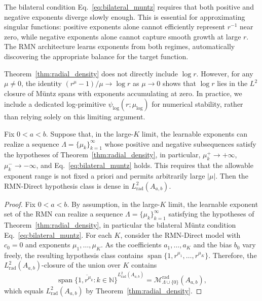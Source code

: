 \documentclass[twoside,11pt]{article}
\newcommand{\N}{\mathbb{N}}
\renewcommand{\eqref}[1]{Eq.~\ref{#1}}
\begin{document}
\begin{remark}
	\label{rem:negative_exponents}
	The bilateral condition \eqref{eq:bilateral_muntz} requires that both positive and negative exponents diverge slowly enough. This is essential for approximating singular functions: positive exponents alone cannot efficiently represent $r^{-1}$ near zero, while negative exponents alone cannot capture smooth growth at large $r$. The RMN architecture learns exponents from both regimes, automatically discovering the appropriate balance for the target function.
\end{remark}

\begin{remark}
	\label{rem:log_extension}
	Theorem~\ref{thm:radial_density} does not directly include $\log r$. However, for any $\mu \neq 0$, the identity $(r^\mu - 1)/\mu \to \log r$ as $\mu \to 0$ shows that $\log r$ lies in the $L^2$ closure of Müntz spans with exponents accumulating at zero. In practice, we include a dedicated log-primitive $\psi_{\log}(r;\mu_{\log})$ for numerical stability, rather than relying solely on this limiting argument.
\end{remark}

\begin{corollary}
	\label{cor:rmn_density}
	Fix $0<a<b$. Suppose that, in the large-$K$ limit, the learnable exponents can realize a sequence $\Lambda=\{\mu_k\}_{k=1}^\infty$ whose positive and negative subsequences satisfy the hypotheses of Theorem~\ref{thm:radial_density}, in particular, $\mu_k^+\to+\infty$, $\mu_k^-\to-\infty$, and \eqref{eq:bilateral_muntz} holds. This requires that the allowable exponent range is not fixed a priori and permits arbitrarily large $|\mu|$. Then the RMN-Direct hypothesis class is dense in $L^2_{\mathrm{rad}}(A_{a,b})$.
\end{corollary}

\begin{proof}
	Fix $0<a<b$. By assumption, in the large-$K$ limit, the learnable exponent set of the RMN can realize a sequence $\Lambda=\{\mu_k\}_{k=1}^\infty$ satisfying the hypotheses of Theorem~\ref{thm:radial_density}, in particular the bilateral Müntz condition \eqref{eq:bilateral_muntz}.
	For each $K$, consider the RMN-Direct model with $c_0=0$ and exponents $\mu_1,\ldots,\mu_K$. As the coefficients $a_1,\ldots,a_K$ and the bias $b_0$ vary freely, the resulting hypothesis class contains $\operatorname{span}\{1,r^{\mu_1},\ldots,r^{\mu_K}\}$.
	Therefore, the $L^2_{\mathrm{rad}}(A_{a,b})$-closure of the union over $K$ contains
	\[
		\overline{\operatorname{span}\{1,r^{\mu_k}:k\in\N\}}^{L^2_{\mathrm{rad}}(A_{a,b})}
		=\mathcal{M}_{\Lambda \cup \{0\}}^{\mathrm{rad}}(A_{a,b}),
	\]
	which equals $L^2_{\mathrm{rad}}(A_{a,b})$ by Theorem~\ref{thm:radial_density}.
\end{proof}
\end{document}
